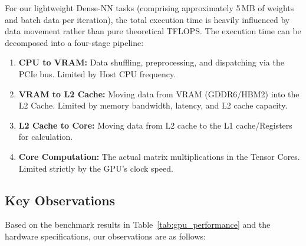 \documentclass[12pt]{article}
\begin{document}
        For our lightweight Dense-NN tasks (comprising approximately 5\,MB of weights and batch data per iteration), the total execution time is heavily influenced by data movement rather than pure theoretical TFLOPS. The execution time can be decomposed into a four-stage pipeline:
        \begin{enumerate}
            \item \textbf{CPU to VRAM:} Data shuffling, preprocessing, and dispatching via the PCIe bus. Limited by Host CPU frequency.
            \item \textbf{VRAM to L2 Cache:} Moving data from VRAM (GDDR6/HBM2) into the L2 Cache. Limited by memory bandwidth, latency, and L2 cache capacity.
            \item \textbf{L2 Cache to Core:} Moving data from L2 cache to the L1 cache/Registers for calculation.
            \item \textbf{Core Computation:} The actual matrix multiplications in the Tensor Cores. Limited strictly by the GPU's clock speed.
        \end{enumerate}


    \subsection{Key Observations}%
    \label{sub:key_observations}

        Based on the benchmark results in Table~\ref{tab:gpu_performance} and the hardware specifications, our observations are as follows:
\end{document}

